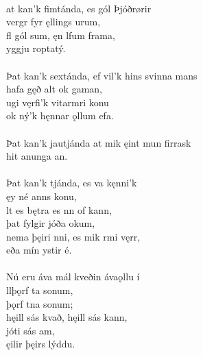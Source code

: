  \\

\bva {}at kan'k fimtánda, \hld es gól {Þ}jóðrørir \\%
\ind {}vergr fyr ęllings urum, \\%
fl gól sum, \hld ęn lfum frama, \\%
\ind {}yggju roptatý.\\%

 \\

\bva Þat kan'k sextánda, \hld ef vil'k hins svinna mans \\%
\ind hafa gęð alt ok gaman, \\%
ugi vęrfi'k \hld {}vitarmri konu \\%
\ind ok ný'k hęnnar ǫllum efa.\\%

 \\

\bva Þat kan'k jautjánda \hld at mik ęint mun firrask \\%
\ind hit anunga an.\\%

 \\

\bva Þat kan'k tjánda, \hld es va kęnni'k \\%
\ind {}ęy né anns konu, \\%
lt es bętra \hld es nn of kann, \\%
\ind þat fylgir jóða okum, \\%
nema þęiri nni, \hld es mik rmi vęrr, \\%
\ind eða mín ystir é.\\%

 \\

\bva Nú eru áva mál \hld kveðin ávaǫllu í \\%
\ind {}llþǫrf ta sonum, \\%
\ind {}þǫrf tna sonum; \\%
hęill sás kvað, \hld hęill sás kann, \\%
\ind {}jóti sás am, \\%
\ind {}ęilir þęirs lýddu.\footnotemark[50]\\%

 \\
